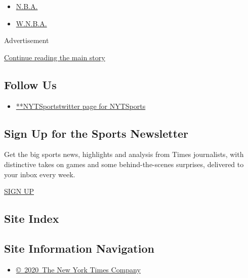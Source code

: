 \begin{itemize}
\tightlist
\item
  \protect\hyperlink{}{N.B.A.}
\item
  \protect\hyperlink{}{W.N.B.A.}
\end{itemize}

Advertisement

\protect\hyperlink{after-mktg}{Continue reading the main story}

\hypertarget{follow-us}{%
\subsection{Follow Us}\label{follow-us}}

\begin{itemize}
\tightlist
\item
  \href{https://twitter.com/NYTSports}{**NYTSportstwitter page for
  NYTSports}
\end{itemize}

\hypertarget{sign-up-for-the-sports-newsletter}{%
\subsection{Sign Up for the Sports
Newsletter}\label{sign-up-for-the-sports-newsletter}}

Get the big sports news, highlights and analysis from Times journalists,
with distinctive takes on games and some behind-the-scenes surprises,
delivered to your inbox every week.

\href{/newsletters/signup/SP}{SIGN UP}

\hypertarget{site-index}{%
\subsection{Site Index}\label{site-index}}

\hypertarget{site-information-navigation}{%
\subsection{Site Information
Navigation}\label{site-information-navigation}}

\begin{itemize}
\tightlist
\item
  \href{https://help.nytimes.com/hc/en-us/articles/115014792127-Copyright-notice}{©~2020~The
  New York Times Company}
\end{itemize}


